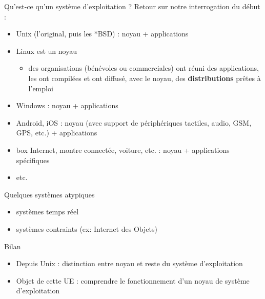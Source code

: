 \begin {frame} {Qu'est-ce qu'un système d'exploitation ?}
    Retour sur notre interrogation du début :
    \begin {itemize}
	\item Unix (l'original, puis les *BSD) : noyau + applications
	\item Linux est un noyau
	    \begin {itemize}
		\item des organisations (bénévoles ou commerciales) ont
		    réuni des applications, les ont compilées et ont
		    diffusé, avec le noyau, des \textbf {distributions}
		    prêtes à l'emploi

	    \end {itemize}
	\item Windows : noyau + applications
	\item Android, iOS : noyau (avec support de périphériques tactiles,
	    audio, GSM, GPS, etc.) + applications
	\item box Internet, montre connectée, voiture, etc. : noyau
	    +  applications spécifiques
	\item etc.
    \end {itemize}
\end {frame}

\begin {frame} {Quelques systèmes atypiques}
    \begin {itemize}
	\item systèmes temps réel
	\item systèmes contraints (ex: Internet des Objets)
    \end {itemize}
\end {frame}

\begin {frame} {Bilan}
    \begin {itemize}
	\item Depuis Unix : distinction entre noyau et reste du système
	    d'exploitation

	\item Objet de cette UE : comprendre le fonctionnement d'un noyau
	    de système d'exploitation

    \end {itemize}

\end {frame}


